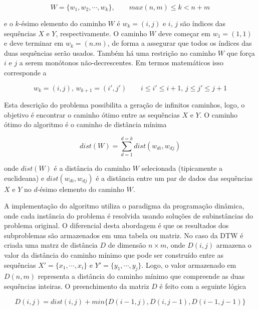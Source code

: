 \begin{equation*}
    W = \{w_1, w_2, \cdots, w_k\}, \qquad max(n, m) \leq k < n + m
\end{equation*}

e o $k$-ésimo elemento do caminho $W$ é $w_k = (i, j)$ e $i$, $j$ são índices das sequências $X$ e $Y$, respectivamente. O caminho $W$ deve começar em $w_1 = (1, 1)$ e deve terminar em $w_k = (n. m)$, de forma a assegurar que todos os índices das duas sequências serão usados. Também há uma restrição no caminho $W$ que força $i$ e $j$ a serem monótonos não-decrescentes. Em termos matemáticos isso corresponde a

\begin{equation*}
    w_k = (i, j),\, w_{k + 1} = (i', j') \qquad i \leq i' \leq i + 1,\, j\leq j' \leq j + 1
\end{equation*}

Esta descrição do problema possibilita a geração de infinitos caminhos, logo, o objetivo é encontrar o caminho ótimo entre as sequências $X$ e $Y$. O caminho ótimo do algoritmo é o caminho de distância mínima

\begin{equation*}
    dist(W) = \sum_{d=1}^{d=k} dist(w_{di}, w_{dj})
\end{equation*}

onde $dist(W)$ é a distância do caminho $W$ selecionada (tipicamente a euclideana) e $dist(w_{di}, w_{dj})$ é a distância entre um par de dados das sequências $X$ e $Y$ no $d$-ésimo elemento do caminho $W$.

A implementação do algoritmo utiliza o paradigma da programação dinâmica, onde cada instância do problema é resolvida usando soluções de subinstâncias do problema original. O diferencial desta abordagem é que os resultados dos subproblemas são armazenados em uma tabela ou matriz. No caso da DTW é criada uma matrz de distância $D$ de dimensão $n \times m$, onde $D(i, j)$ armazena o valor da distância do caminho mínimo que pode ser construído entre as sequências $X' = \{x_1, \cdots, x_i\}$ e $Y' = \{y_1, \cdots, y_j\}$. Logo, o valor armazenado em $D(n, m)$ representa a distância do caminho mínimo que compreende as duas sequências inteiras. O preenchimento da matriz $D$ é feito com a seguinte lógica

\begin{equation*}
    D(i, j) = dist(i, j) + min\{D(i - 1, j), D(i, j - 1), D(i - 1, j - 1)\}
\end{equation*}

